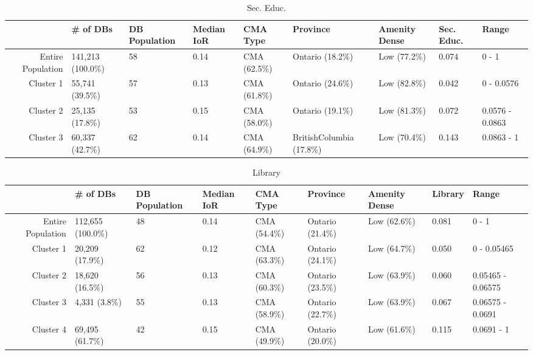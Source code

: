 \documentclass[10pt, a4paper]{article}
\begin{document}
 \pagebreak 
 
\begin{sidewaystable}[ht]
\centering
\begin{tabular}{rllllllll}
  \hline
 & \# of DBs & DB Population & Median IoR & CMA Type & Province & Amenity Dense & Sec. Educ. & Range \\ 
  \hline
Entire Population & 141,213 (100.0\%) & 58 & 0.14 & CMA (62.5\%) & Ontario (18.2\%) & Low (77.2\%) & 0.074 & 0 - 1 \\ 
  Cluster 1 & 55,741 (39.5\%) & 57 & 0.13 & CMA (61.8\%) & Ontario (24.6\%) & Low (82.8\%) & 0.042 & 0 - 0.0576 \\ 
  Cluster 2 & 25,135 (17.8\%) & 53 & 0.15 & CMA (58.0\%) & Ontario (19.1\%) & Low (81.3\%) & 0.072 & 0.0576 - 0.0863 \\ 
  Cluster 3 & 60,337 (42.7\%) & 62 & 0.14 & CMA (64.9\%) & BritishColumbia (17.8\%) & Low (70.4\%) & 0.143 & 0.0863 - 1 \\ 
   \hline
\end{tabular}
\caption{Sec. Educ.} 
\end{sidewaystable}





 \pagebreak 
 
\begin{sidewaystable}[ht]
\centering
\begin{tabular}{rllllllll}
  \hline
 & \# of DBs & DB Population & Median IoR & CMA Type & Province & Amenity Dense & Library & Range \\ 
  \hline
Entire Population & 112,655 (100.0\%) & 48 & 0.14 & CMA (54.4\%) & Ontario (21.4\%) & Low (62.6\%) & 0.081 & 0 - 1 \\ 
  Cluster 1 & 20,209 (17.9\%) & 62 & 0.12 & CMA (63.3\%) & Ontario (24.1\%) & Low (64.7\%) & 0.050 & 0 - 0.05465 \\ 
  Cluster 2 & 18,620 (16.5\%) & 56 & 0.13 & CMA (60.3\%) & Ontario (23.5\%) & Low (63.9\%) & 0.060 & 0.05465 - 0.06575 \\ 
  Cluster 3 & 4,331 (3.8\%) & 55 & 0.13 & CMA (58.9\%) & Ontario (22.7\%) & Low (63.9\%) & 0.067 & 0.06575 - 0.0691 \\ 
  Cluster 4 & 69,495 (61.7\%) & 42 & 0.15 & CMA (49.9\%) & Ontario (20.0\%) & Low (61.6\%) & 0.115 & 0.0691 - 1 \\ 
   \hline
\end{tabular}
\caption{Library} 
\end{sidewaystable}
\end{document}
